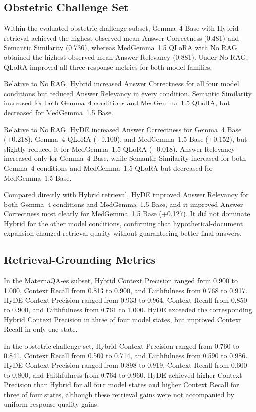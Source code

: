 \subsection{Obstetric Challenge Set}
Within the evaluated obstetric challenge subset, Gemma~4 Base with Hybrid
retrieval achieved the highest observed mean Answer Correctness (0.481) and
Semantic Similarity (0.736), whereas MedGemma~1.5 QLoRA with No RAG obtained
the highest observed mean Answer Relevancy (0.881). Under No RAG, QLoRA
improved all three response metrics for both model families.

Relative to No RAG, Hybrid increased Answer Correctness for all
four model conditions but reduced Answer Relevancy in every condition.
Semantic Similarity increased for both Gemma~4 conditions and MedGemma~1.5
QLoRA, but decreased for MedGemma~1.5 Base.

Relative to No RAG, HyDE increased Answer Correctness for Gemma~4
Base (+0.218), Gemma~4 QLoRA (+0.100), and MedGemma~1.5 Base (+0.152), but
slightly reduced it for MedGemma~1.5 QLoRA ($-$0.018). Answer Relevancy
increased only for Gemma~4 Base, while Semantic Similarity increased for
both Gemma~4 conditions and MedGemma~1.5 QLoRA but decreased for
MedGemma~1.5 Base.

Compared directly with Hybrid retrieval, HyDE improved Answer Relevancy for
both Gemma~4 conditions and MedGemma~1.5 Base, and it improved Answer
Correctness most clearly for MedGemma~1.5 Base (+0.127). It did not
dominate Hybrid for the other model conditions, confirming that
hypothetical-document expansion changed retrieval quality without
guaranteeing better final answers.

\subsection{Retrieval-Grounding Metrics}
In the MaternaQA-es subset, Hybrid Context Precision ranged from 0.900 to
1.000, Context Recall from 0.813 to 0.900, and Faithfulness from 0.768 to
0.917. HyDE Context Precision ranged from 0.933 to 0.964, Context Recall
from 0.850 to 0.900, and Faithfulness from 0.761 to 1.000. HyDE exceeded
the corresponding Hybrid Context Precision in three of four model states,
but improved Context Recall in only one state.

In the obstetric challenge set, Hybrid Context Precision ranged from 0.760
to 0.841, Context Recall from 0.500 to 0.714, and Faithfulness from 0.590
to 0.986. HyDE Context Precision ranged from 0.898 to 0.919, Context Recall
from 0.600 to 0.800, and Faithfulness from 0.764 to 0.960. HyDE achieved
higher Context Precision than Hybrid for all four model states and higher
Context Recall for three of four states, although these retrieval gains
were not accompanied by uniform response-quality gains.

